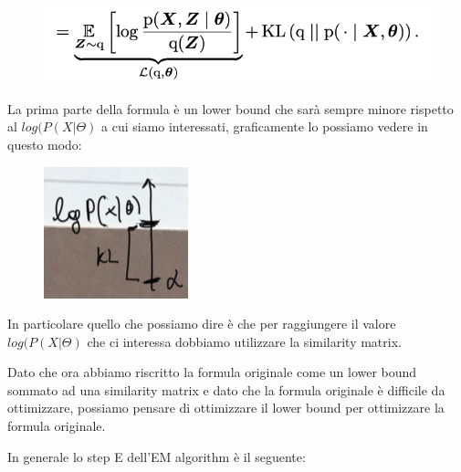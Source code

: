 \documentclass[14pt]{extreport}
\begin{document}
\begin{itemize}
\begin{figure}[H] 
\centering
\includegraphics[width=0.7\linewidth]{563.jpeg}
\end{figure}
La prima parte della formula è un lower bound che sarà sempre minore rispetto al $log(P(X|\Theta)$ a cui siamo interessati, graficamente lo possiamo vedere in questo modo:

\begin{figure}[H] 
\centering
\includegraphics[width=0.7\linewidth]{562.jpeg}
\end{figure}
In particolare quello che possiamo dire è che per raggiungere il valore $log(P(X|\Theta)$ che ci interessa dobbiamo utilizzare la similarity matrix.
\end{itemize} 

Dato che ora abbiamo riscritto la formula originale come un lower bound sommato ad una similarity matrix e dato che la formula originale è difficile da ottimizzare, 
possiamo pensare di ottimizzare il lower bound per ottimizzare la formula originale.

In generale lo step E dell'EM algorithm è il seguente:
\end{document}

